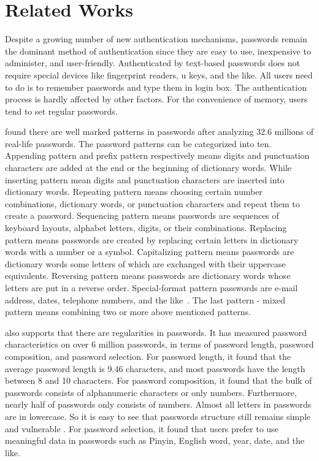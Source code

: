 \section{Related Works}
Despite a growing number of new authentication mechanisms, passwords remain the dominant method of authentication since they are easy to use, inexpensive to administer, and user-friendly. Authenticated by text-based passwords does not require special devices like fingerprint readers, u keys, and the like. All users need to do is to remember passwords and type them in login box. The authentication process is hardly affected by other factors. For the convenience of memory, users tend to set regular passwords. 


\cite{Nakhila2015Parallel} found there are well marked patterns in passwords after analyzing 32.6 millions of real-life passwords. The password patterns can be categorized into ten. Appending pattern and prefix pattern respectively means digits and punctuation characters are added at the end or the beginning of dictionary words. While inserting pattern mean digits and punctuation characters are inserted into dictionary words. Repeating pattern means choosing certain number combinations, dictionary words, or punctuation characters and repeat them to create a password. Sequencing pattern means passwords are sequences of keyboard layouts, alphabet letters, digits, or their combinations. Replacing pattern means passwords are created by replacing certain letters in dictionary words with a number or a symbol. Capitalizing pattern means passwords are dictionary words some letters of which are exchanged with their uppercase equivalents. Reversing pattern means passwords are dictionary words whose letters are put in a reverse order. Special-format pattern passwords are e-mail address, dates, telephone numbers, and the like~\cite{Chen2015The}. The last pattern - mixed pattern means combining two or more above mentioned patterns. 


\cite{morris1979password} also supports that there are regularities in passwords. It has measured password characteristics on over 6 million passwords, in terms of password length, password composition, and password selection. For password length, it found that the average password length is 9.46 characters, and most passwords have the length between 8 and 10 characters. For password composition, it found that the bulk of passwords consists of alphanumeric characters or only numbers. Furthermore, nearly half of passwords only consists of numbers. Almost all letters in passwords are in lowercase. So it is easy to see that passwords structure still remains simple and vulnerable \cite{Studer2010Mobile}. For password selection, it found that users prefer to use meaningful data in passwords such as Pinyin, English word, year, date, and the like. 


